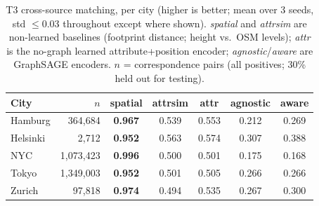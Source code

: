 \begin{table}[t]
  \centering
  \caption{T3 cross-source matching, per city (higher is better; mean over 3
  seeds, std $\le$0.03 throughout except where shown). \emph{spatial} and
  \emph{attrsim} are non-learned baselines (footprint distance; height vs.\
  OSM levels); \emph{attr} is the no-graph learned attribute+position encoder;
  \emph{agnostic}/\emph{aware} are GraphSAGE encoders. $n$ = correspondence
  pairs (all positives; 30\% held out for testing).}
  \label{tab:repL-match}
  \small\setlength{\tabcolsep}{3pt}
  \begin{tabular}{@{}lrccccc@{}}
    \toprule
    City & $n$ & spatial & attrsim & attr & agnostic & aware\\
    \midrule
    Hamburg  & 364{,}684     & \textbf{0.967} & 0.539 & 0.553 & 0.212 & 0.269\\
    Helsinki & 2{,}712       & \textbf{0.952} & 0.563 & 0.574 & 0.307 & 0.388\\
    NYC      & 1{,}073{,}423 & \textbf{0.996} & 0.500 & 0.501 & 0.175 & 0.168\\
    Tokyo    & 1{,}349{,}003 & \textbf{0.952} & 0.501 & 0.505 & 0.266 & 0.266\\
    Zurich   & 97{,}818      & \textbf{0.974} & 0.494 & 0.535 & 0.267 & 0.300\\
    \bottomrule
  \end{tabular}
\end{table}

